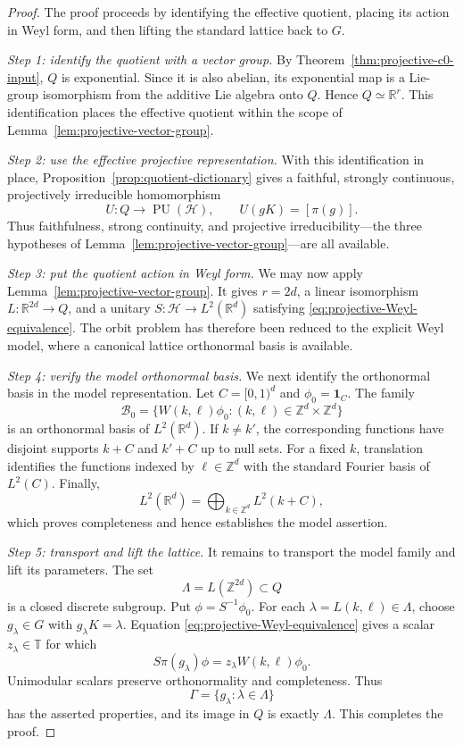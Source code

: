 \documentclass[10pt,a4paper]{amsart}
\numberwithin{equation}{section}
\newcommand{\cH}{\mathcal H}
\newcommand{\R}{\mathbb R}
\newcommand{\T}{\mathbb T}
\newcommand{\PU}{\operatorname{PU}}
\newcommand{\Step}[1]{\par\medskip\noindent\textit{#1.}\quad}
\begin{document}
\begin{proof}
The proof proceeds by identifying the effective quotient, placing its action
in Weyl form, and then lifting the standard lattice back to $G$.

\Step{Step 1: identify the quotient with a vector group}
By Theorem~\ref{thm:projective-c0-input}, $Q$ is exponential.  Since it is
also abelian, its exponential map is a Lie-group isomorphism from the
additive Lie algebra onto $Q$.  Hence $Q\simeq\R^r$.  This identification
places the effective quotient within the scope of
Lemma~\ref{lem:projective-vector-group}.

\Step{Step 2: use the effective projective representation}
With this identification in place,
Proposition~\ref{prop:quotient-dictionary} gives a faithful, strongly
continuous, projectively irreducible homomorphism
\[
 U:Q\longrightarrow\PU(\cH),
 \qquad U(gK)=[\pi(g)].
\]
Thus faithfulness, strong continuity, and projective irreducibility---the
three hypotheses of Lemma~\ref{lem:projective-vector-group}---are all
available.

\Step{Step 3: put the quotient action in Weyl form}
We may now apply Lemma~\ref{lem:projective-vector-group}.  It gives $r=2d$,
a linear isomorphism
$L:\R^{2d}\to Q$, and a unitary $S:\cH\to L^2(\R^d)$ satisfying
\eqref{eq:projective-Weyl-equivalence}.  The orbit problem has therefore been
reduced to the explicit Weyl model, where a canonical lattice orthonormal
basis is available.

\Step{Step 4: verify the model orthonormal basis}
We next identify the orthonormal basis in the model representation.  Let
$C=[0,1)^d$ and $\phi_0=\mathbf1_C$.  The family
\begin{equation}\label{eq:Gabor-ONB}
 \mathcal B_0
 =\{W(k,\ell)\phi_0:(k,\ell)\in\mathbb Z^d\times\mathbb Z^d\}
\end{equation}
is an orthonormal basis of $L^2(\R^d)$.  If $k\neq k'$, the corresponding
functions have disjoint supports $k+C$ and $k'+C$ up to null sets.  For a
fixed $k$, translation identifies the functions indexed by
$\ell\in\mathbb Z^d$ with the standard Fourier basis of $L^2(C)$.  Finally,
\[
 L^2(\R^d)=\bigoplus_{k\in\mathbb Z^d}L^2(k+C),
\]
which proves completeness and hence establishes the model assertion.

\Step{Step 5: transport and lift the lattice}
It remains to transport the model family and lift its parameters.  The set
\begin{equation}\label{eq:quotient-lattice}
 \Lambda=L(\mathbb Z^{2d})\subset Q
\end{equation}
is a closed discrete subgroup.  Put $\phi=S^{-1}\phi_0$.  For each
$\lambda=L(k,\ell)\in\Lambda$, choose $g_\lambda\in G$ with
$g_\lambda K=\lambda$.  Equation
\eqref{eq:projective-Weyl-equivalence} gives a scalar $z_\lambda\in\T$ for
which
\begin{equation}\label{eq:lifted-Weyl-atom}
 S\pi(g_\lambda)\phi=z_\lambda W(k,\ell)\phi_0.
\end{equation}
Unimodular scalars preserve orthonormality and completeness.  Thus
\[
 \Gamma=\{g_\lambda:\lambda\in\Lambda\}
\]
has the asserted properties, and its image in $Q$ is exactly $\Lambda$.
This completes the proof.
\end{proof}
\end{document}
